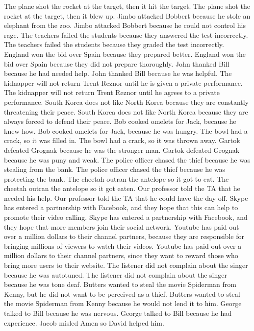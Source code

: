 \documentclass{article}
\begin{document}
\begin{enumerate}
The plane shot the rocket at the target, then it hit the target.
The plane shot the rocket at the target, then it blew up.
Jimbo attacked Bobbert because he stole an elephant from the zoo.
Jimbo attacked Bobbert because he could not control his rage.
The teachers failed the students because they answered the test incorrectly.
The teachers failed the students because they graded the test incorrectly.
England won the bid over Spain because they prepared better.
England won the bid over Spain because they did not prepare thoroughly.
John thanked Bill because he had needed help.
John thanked Bill because he was helpful.
The kidnapper will not return Trent Reznor until he is given a private performance.
The kidnapper will not return Trent Reznor until he agrees to a private performance.
South Korea does not like North Korea because they are constantly threatening their peace.
South Korea does not like North Korea because they are always forced to defend their peace.
Bob cooked omelets for Jack, because he knew how.
Bob cooked omelets for Jack, because he was hungry.
The bowl had a crack, so it was filled in.
The bowl had a crack, so it was thrown away.
Gartok defeated Grognak because he was the stronger man.
Gartok defeated Grognak because he was puny and weak.
The police officer chased the thief because he was stealing from the bank.
The police officer chased the thief because he was protecting the bank.
The cheetah outran the antelope so it got to eat.
The cheetah outran the antelope so it got eaten.
Our professor told the TA that he needed his help.
Our professor told the TA that he could have the day off.
Skype has entered a partnership with Facebook, and they hope that this can help to promote their video calling.
Skype has entered a partnership with Facebook, and they hope that more members join their social network.
Youtube has paid out over a million dollars to their channel partners, because they are responsible for bringing millions of viewers to watch their videos.
Youtube has paid out over a million dollars to their channel partners, since they want to reward those who bring more users to their website.
The listener did not complain about the singer because he was autotuned.
The listener did not complain about the singer because he was tone deaf.
Butters wanted to steal the movie Spiderman from Kenny, but he did not want to be perceived as a thief.
Butters wanted to steal the movie Spiderman from Kenny because he would not lend it to him.
George talked to Bill because he was nervous.
George talked to Bill because he had experience.
Jacob misled Amen so David helped him.

\end{enumerate}
\end{document}

